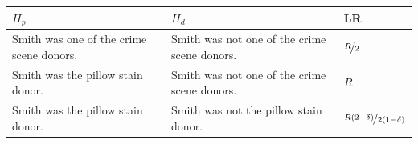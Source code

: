 \documentclass[10pt,dvipsnames,enabledeprecatedfontcommands]{scrartcl}
\begin{document}
\begin{center}
    \footnotesize
    \begin{tabular}{@{}p{5cm}p{5cm}l@{}}
        \toprule
        $H_p$ & $H_d$  & LR \\ \midrule
        Smith was one of the crime scene donors.   &  Smith was not one of the crime scene donors. & $\nicefrac{R}{2}$   \\
        Smith was the pillow stain donor.     & Smith was not one of the crime scene donors.& $R$\\
        Smith was the pillow stain donor. & Smith was not the pillow stain donor. &  $\nicefrac{R(2-\delta)}{2(1-\delta)}$
        \\ \bottomrule
    \end{tabular}
\end{center}
\end{document}
